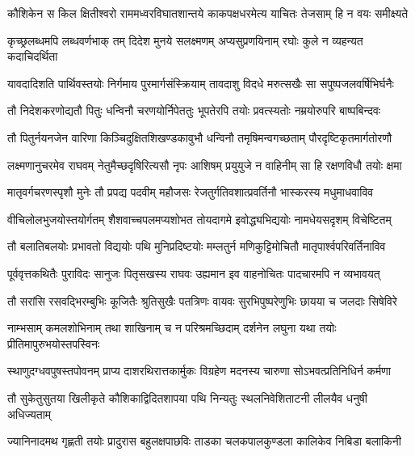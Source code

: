 
\fourlineindentedshloka
{कौशिकेन स किल क्षितीश्वरो}
{राममध्वरविघातशान्तये}
{काकपक्षधरमेत्य याचितः}
{तेजसाम् हि न वयः समीक्ष्यते} %

\fourlineindentedshloka
{कृच्छ्रलब्धमपि लब्धवर्णभाक्}
{तम् दिदेश मुनये सलक्ष्मणम्}
{अप्यसुप्रणयिनाम् रघोः कुले}
{न व्यहन्यत कदाचिदर्थिता} %

\fourlineindentedshloka
{यावदादिशति पार्थिवस्तयोः}
{निर्गमाय पुरमार्गसंस्क्रियाम्}
{तावदाशु विदधे मरुत्सखैः}
{सा सपुष्पजलवर्षिभिर्घनैः} %

\fourlineindentedshloka
{तौ निदेशकरणोद्यतौ पितुः}
{धन्विनौ चरणयोर्निपेततुः}
{भूपतेरपि तयोः प्रवत्स्यतोः}
{नम्रयोरुपरि बाष्पबिन्दवः} %

\fourlineindentedshloka
{तौ पितुर्नयनजेन वारिणा}
{किञ्चिदुक्षितशिखण्डकावुभौ}
{धन्विनौ तमृषिमन्वगच्छताम्}
{पौरदृष्टिकृतमार्गतोरणौ} %

\fourlineindentedshloka
{लक्ष्मणानुचरमेव राघवम्}
{नेतुमैच्छदृषिरित्यसौ नृपः}
{आशिषम् प्रयुयुजे न वाहिनीम्}
{सा हि रक्षणविधौ तयोः क्षमा} %

\fourlineindentedshloka
{मातृवर्गचरणस्पृशौ मुनेः}
{तौ प्रपद्य पदवीम् महौजसः}
{रेजतुर्गतिवशात्प्रवर्तिनौ}
{भास्करस्य मधुमाधवाविव} %

\fourlineindentedshloka
{वीचिलोलभुजयोस्तयोर्गतम्}
{शैशवाच्चपलमप्यशोभत}
{तोयदागमे इवोद्ध्यभिद्ययोः}
{नामधेयसदृशम् विचेष्टितम्} %

\fourlineindentedshloka
{तौ बलातिबलयोः प्रभावतो}
{विद्ययोः पथि मुनिप्रदिष्टयोः}
{मम्लतुर्न मणिकुट्टिमोचितौ}
{मातृपार्श्वपरिवर्तिनाविव} %

\fourlineindentedshloka
{पूर्ववृत्तकथितैः पुराविदः}
{सानुजः पितृसखस्य राघवः}
{उह्यमान इव वाहनोचितः}
{पादचारमपि न व्यभावयत्} %

\fourlineindentedshloka
{तौ सरांसि रसवद्भिरम्बुभिः}
{कूजितैः श्रुतिसुखैः पतत्रिणः}
{वायवः सुरभिपुष्परेणुभिः}
{छायया च जलदाः सिषेविरे} %

\fourlineindentedshloka
{नाम्भसाम् कमलशोभिनाम् तथा}
{शाखिनाम् च न परिश्रमच्छिदाम्}
{दर्शनेन लघुना यथा तयोः}
{प्रीतिमापुरुभयोस्तपस्विनः} %

\fourlineindentedshloka
{स्थाणुदग्धवपुषस्तपोवनम्}
{प्राप्य दाशरथिरात्तकार्मुकः}
{विग्रहेण मदनस्य चारुणा}
{सोऽभवत्प्रतिनिधिर्न कर्मणा} %

\fourlineindentedshloka
{तौ सुकेतुसुतया खिलीकृते}
{कौशिकाद्विदितशापया पथि}
{निन्यतुः स्थलनिवेशिताटनी}
{लीलयैव धनुषी अधिज्यताम्} %

\fourlineindentedshloka
{ज्यानिनादमथ गृह्णती तयोः}
{प्रादुरास बहुलक्षपाछविः}
{ताडका चलकपालकुण्डला}
{कालिकेव निबिडा बलाकिनी} %

